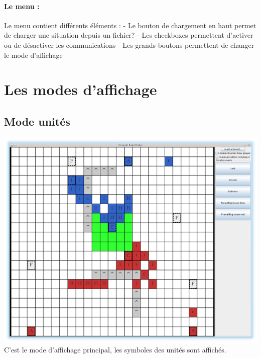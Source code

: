 		\paragraph{Le menu :}
	
			Le menu contient différents éléments :
			- Le bouton de chargement en haut permet de charger une situation depuis un fichier?
			- Les checkboxes permettent d'activer ou de désactiver les communications
			- Les grands boutons permettent de changer le mode d'affichage

	\section{Les modes d'affichage}

		\subsection{Mode unités}
			\includegraphics[scale=0.4]{images/screen1.eps}
			C'est le mode d'affichage principal, les symboles des unités sont affichés.

			\clearpage


